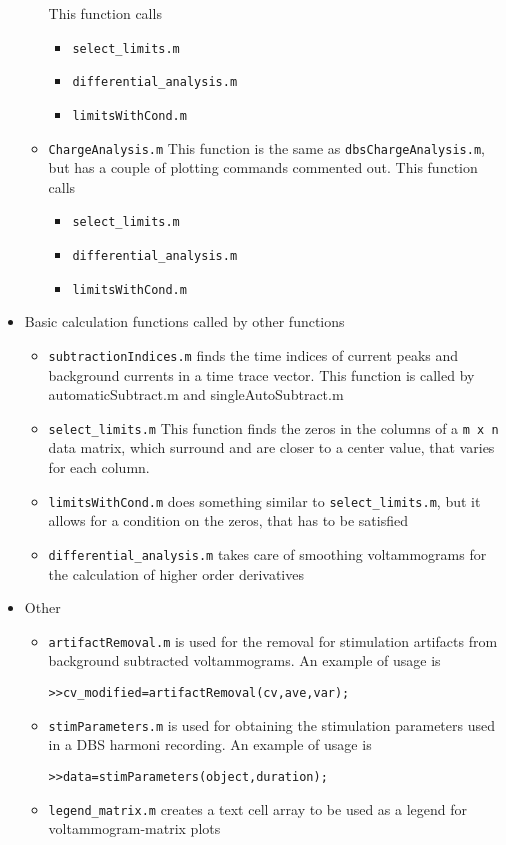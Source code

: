 \documentclass{article}
\begin{document}
\begin{itemize}
\begin{itemize}
  This function calls
  \begin{itemize}	
  \item \verb|select_limits.m|
  \item \verb|differential_analysis.m|
  \item \verb|limitsWithCond.m|
  \end{itemize}
  \item \verb|ChargeAnalysis.m| This function is the same as \verb|dbsChargeAnalysis.m|, but has a couple of plotting commands commented out. This function calls
  	\begin{itemize}	
  	\item \verb|select_limits.m|
  	\item \verb|differential_analysis.m|
	\item \verb|limitsWithCond.m|
	\end{itemize}

  \end{itemize}
  \item Basic calculation functions called by other functions
  \begin{itemize}
  \item \verb|subtractionIndices.m| finds the time indices of current peaks and background currents in a time trace vector. This function is called by \textsf{automaticSubtract.m} and \textsf{singleAutoSubtract.m}
  \item \verb|select_limits.m| This function finds the zeros in the columns of a \verb|m x n| data matrix, which surround and are closer to a center value, that varies for each column. 
  \item \verb|limitsWithCond.m| does something similar to  \verb|select_limits.m|, but it allows for a condition on the zeros, that has to be satisfied
   \item \verb|differential_analysis.m| takes care of smoothing voltammograms for the calculation of higher order derivatives
  \end{itemize}
  \item Other
  \begin{itemize}
  \item\verb|artifactRemoval.m| is used for the removal for stimulation artifacts from background subtracted voltammograms. An example of usage is 
  
  \verb|>>cv_modified=artifactRemoval(cv,ave,var);|
  
   \item\verb|stimParameters.m| is used for obtaining the stimulation parameters used in a DBS harmoni recording. An example of usage is 
  
  \verb|>>data=stimParameters(object,duration);|
  
    \item \verb|legend_matrix.m| creates a text cell array to be used as a legend for voltammogram-matrix plots
  \end{itemize}
\end{itemize}
\end{document}

